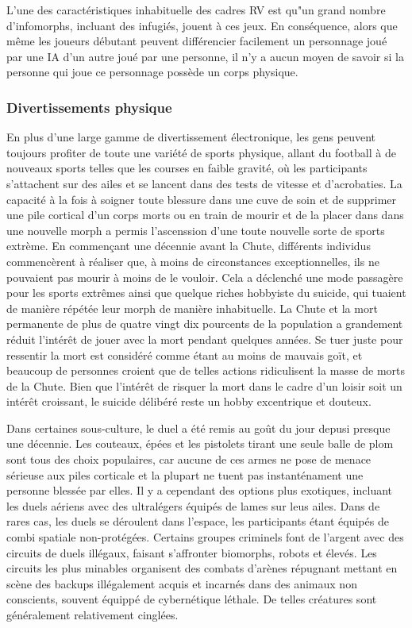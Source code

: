 L'une des caractéristiques inhabituelle des cadres RV est qu"un grand nombre d'infomorphs, incluant des infugiés, jouent à ces jeux. En conséquence, alors que même les joueurs débutant peuvent différencier facilement un personnage joué par une IA d'un autre joué par une personne, il n'y a aucun moyen de savoir si la personne qui joue ce personnage possède un corps physique. 

\subsubsection{Divertissements physique} \label{sec:phys-entert} 

En plus d'une large gamme de divertissement électronique, les gens peuvent toujours profiter de toute une variété de sports physique, allant du football à de nouveaux sports telles que les courses en faible gravité, où les participants s'attachent sur des ailes et se lancent dans des tests de vitesse et d'acrobaties. La capacité à la fois à soigner toute blessure dans une cuve de soin et de supprimer une pile cortical d'un corps morts ou en train de mourir et de la placer dans dans une nouvelle morph a permis l'ascenssion d'une toute nouvelle sorte de sports extrème. En commençant une décennie avant la Chute, différents individus commencèrent à réaliser que, à moins de circonstances exceptionnelles, ils ne pouvaient pas mourir à moins de le vouloir. Cela a déclenché une mode passagère pour les sports extrêmes ainsi que quelque riches hobbyiste du suicide, qui tuaient de manière répétée leur morph de manière inhabituelle. La Chute et la mort permanente de plus de quatre vingt dix pourcents de la population a grandement réduit l'intérêt de jouer avec la mort pendant quelques années. Se tuer juste pour ressentir la mort est considéré comme étant au moins de mauvais goït, et beaucoup de personnes croient que de telles actions ridiculisent la masse de morts de la Chute. Bien que l'intérêt de risquer la mort dans le cadre d'un loisir soit un intérêt croissant, le suicide délibéré reste un hobby excentrique et douteux. 

Dans certaines sous-culture, le duel a été remis au goût du jour depusi presque une décennie. Les couteaux, épées et les pistolets tirant une seule balle de plom sont tous des choix populaires, car aucune de ces armes ne pose de menace sérieuse aux piles corticale et la plupart ne tuent pas instanténament une personne blessée par elles. Il y a cependant des options plus exotiques, incluant les duels aériens avec des ultralégers équipés de lames sur leus ailes. Dans de rares cas, les duels se déroulent dans l'espace, les participants étant équipés de combi spatiale non-protégées. Certains groupes criminels font de l'argent avec des circuits de duels illégaux, faisant s'affronter biomorphs, robots et élevés. Les circuits les plus minables organisent des combats d'arènes répugnant mettant en scène des backups illégalement acquis et incarnés dans des animaux non conscients, souvent équippé de cybernétique léthale. De telles créatures sont généralement relativement cinglées. 

